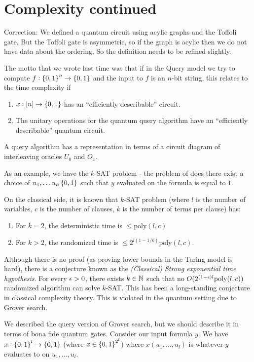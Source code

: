\section{Complexity continued}

Correction: We defined a quantum circuit using acylic graphs and the Toffoli gate. But the Toffoli gate is asymmetric, so if the graph is acylic then we do not have data about the ordering. So the definition needs to be refined slightly.

The motto that we wrote last time was that if in the Query model we try to compute $f: \set{0, 1}^n \to \set{0, 1}$ and the input to $f$ is an $n$-bit string, this relates to the time complexity if
\begin{enumerate}
    \item $x : [n] \to \set{0, 1}$ has an ``efficiently describable'' circuit.
    \item The unitary operations for the quantum query algorithm have an ``efficiently describable'' quantum circuit.
\end{enumerate}

A query algorithm has a representation in terms of a circuit diagram of interleaving oracles $U_0$ and $O_x$. 

As an example, we have the $k$-SAT problem - the problem of does there exist a choice of $u_1, \ldots u_n \set{0, 1}$ such that $y$ evaluated on the formula is equal to $1$. 

On the classical side, it is known that $k$-SAT problem (where $l$ is the number of variables, $c$ is the number of clauses, $k$ is the number of terms per clause) has:
\begin{enumerate}
    \item For $k = 2$, the deterministic time is $\leq \text{poly}(l, c)$
    \item For $k > 2$, the randomized time is $\leq 2^{l(1-1/k)}\text{poly}(l, c)$. 
\end{enumerate}

Although there is no proof (as proving lower bounds in the Turing model is hard), there is a conjecture known as the \emph{(Classical) Strong exponential time hypothesis}. For every $\epsilon > 0$, there exists $k \in \mathbb{N}$ such that no $O(2^{(1-\epsilon)l}\text{poly}(l, c))$ randomized algorithm can solve $k$-SAT. This has been a long-standing conjecture in classical complexity theory. This is violated in the quantum setting due to Grover search.

We described the query version of Grover search, but we should describe it in terms of bona fide quantum gates. Consider our input formula $y$. We have $x: \set{0, 1}^l \to \set{0, 1}$ (where $x \in \set{0, 1}^{2^l}$) where $x(u_1, \ldots, u_l)$ is whatever $y$ evaluates to on $u_1, \ldots, u_l$. 

